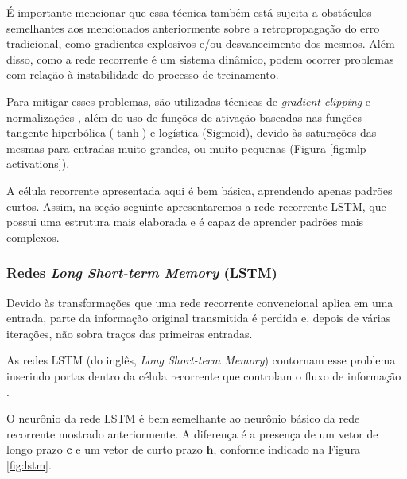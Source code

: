 \documentclass[a4paper, 12pt]{article}
\newcommand{\sigmoid}{\text{Sigmoid}}
\begin{document}
É importante mencionar que essa técnica também está sujeita a obstáculos semelhantes aos mencionados anteriormente sobre a retropropagação do erro tradicional, como gradientes explosivos e/ou desvanecimento dos mesmos. Além disso, como a rede recorrente é um sistema dinâmico, podem ocorrer problemas com relação à instabilidade do processo de treinamento. 

Para mitigar esses problemas, são utilizadas técnicas de \textit{gradient clipping} e normalizações \cite{geron2019hands}, além do uso de funções de ativação baseadas nas funções tangente hiperbólica ($\tanh$) e logística ($\sigmoid$), devido às saturações das mesmas para entradas muito grandes, ou muito pequenas (Figura \ref{fig:mlp-activations}).

A célula recorrente apresentada aqui é bem básica, aprendendo apenas padrões curtos. Assim, na seção seguinte apresentaremos a rede recorrente LSTM, que possui uma estrutura mais elaborada e é capaz de aprender padrões mais complexos.

\subsubsection{Redes \textit{Long Short-term Memory} (LSTM)}

Devido às transformações que uma rede recorrente convencional aplica em uma entrada, parte da informação original transmitida é perdida e, depois de várias iterações, não sobra traços das primeiras entradas.

As redes LSTM (do inglês, \textit{Long Short-term Memory}) contornam esse problema inserindo portas dentro da célula recorrente que controlam o fluxo de informação \cite{greff2016lstm}.

O neurônio da rede LSTM é bem semelhante ao neurônio básico da rede recorrente mostrado anteriormente. A diferença é a presença de um vetor de longo prazo $\mathbf{c}$ e um vetor de curto prazo $\mathbf{h}$, conforme indicado na Figura \ref{fig:lstm}.
\end{document}
